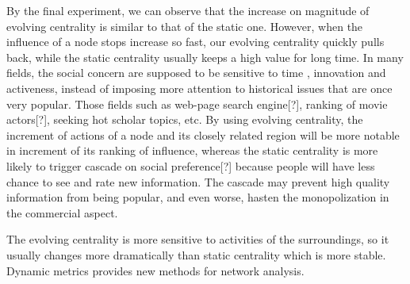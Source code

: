 \documentclass[12pt,abstract=true]{scrartcl}
\numberwithin{equation}{section}
\theoremstyle{definition}   \newtheorem{definition}{Definition}[section]
\theoremstyle{plain}        \newtheorem{theorem}{Theorem}[section]
\theoremstyle{plain}        \newtheorem{observation}{Observation}[section]
\theoremstyle{plain}        \newtheorem{fact}{Fact}[section]
\theoremstyle{plain}        \newtheorem{claim}{Claim}[section]
\theoremstyle{plain}        \newtheorem{lemma}[theorem]{Lemma}
\theoremstyle{plain}        \newtheorem{corollary}[theorem]{Corollary}
\theoremstyle{remark}       \newtheorem{example}{Example}[section]
\theoremstyle{remark}       \newtheorem{remark}{Remark}[section]
\begin{document}
By the final experiment, we can observe that the increase on magnitude of
evolving centrality is similar to that of the static one. However, when the
influence of a node stops increase so fast, our evolving centrality quickly
pulls back, while the static centrality usually keeps a high value for long
time. In many fields, the social concern are supposed to be sensitive to time
, innovation and activeness, instead of imposing more attention to historical
issues that are once very popular. Those fields such as web-page search
engine[?], ranking of movie actors[?], seeking hot scholar topics, etc.
By using evolving centrality, the increment of actions of a node and its
closely related region will be more notable in increment of its ranking of
influence, whereas the static centrality is more likely to trigger cascade on
social preference[?] because people will have less chance to see and rate new
information. The cascade may prevent high quality information from being
popular, and even worse, hasten the monopolization in the commercial aspect.

The evolving centrality is more sensitive to activities of the surroundings, so
it usually changes more dramatically than static centrality which is more
stable. Dynamic metrics provides new methods for network analysis.



\end{document}
